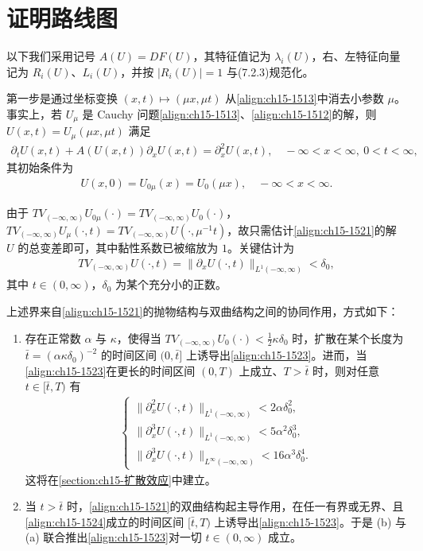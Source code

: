 \documentclass[../../main.tex]{subfiles}
\begin{document}
\section{证明路线图}\label{section:ch15-证明路线图}

以下我们采用记号 $A(U)=DF(U)$，其特征值记为 $\lambda_i(U)$，右、左特征向量记为 $R_i(U)$、$L_i(U)$，并按 $|R_i(U)|=1$ 与(7.2.3)规范化。

第一步是通过坐标变换 $(x,t)\mapsto(\mu x,\mu t)$ 从\eqref{align:ch15-1513}中消去小参数 $\mu$。事实上，若 $U_\mu$ 是 Cauchy 问题\eqref{align:ch15-1513}、\eqref{align:ch15-1512}的解，则 $U(x,t)=U_\mu(\mu x,\mu t)$ 满足
\begin{align}
\partial_t U(x,t)+A(U(x,t))\partial_xU(x,t)=\partial_x^2U(x,t),\quad-\infty<x<\infty,\ 0<t<\infty,
\label{align:ch15-1521}
\end{align}
其初始条件为
\begin{align}
U(x,0)=U_{0\mu}(x)=U_0(\mu x),\quad-\infty<x<\infty.
\label{align:ch15-1522}
\end{align}

由于 $TV_{(-\infty,\infty)}U_{0\mu}(\cdot)=TV_{(-\infty,\infty)}U_0(\cdot)$，$TV_{(-\infty,\infty)}U_\mu(\cdot,t)=TV_{(-\infty,\infty)}U(\cdot,\mu^{-1}t)$，故只需估计\eqref{align:ch15-1521}的解 $U$ 的总变差即可，其中黏性系数已被缩放为 $1$。关键估计为
\begin{align}
TV_{(-\infty,\infty)}U(\cdot,t)=\|\partial_xU(\cdot,t)\|_{L^1(-\infty,\infty)}<\delta_0,
\label{align:ch15-1523}
\end{align}
其中 $t\in(0,\infty)$，$\delta_0$ 为某个充分小的正数。

上述界来自\eqref{align:ch15-1521}的抛物结构与双曲结构之间的协同作用，方式如下：
\begin{enumerate}
\item\label{item:ch15-152-a} 存在正常数 $\alpha$ 与 $\kappa$，使得当 $TV_{(-\infty,\infty)}U_0(\cdot)<\frac12\kappa\delta_0$ 时，扩散在某个长度为 $\bar t=(\alpha\kappa\delta_0)^{-2}$ 的时间区间 $(0,\bar t]$ 上诱导出\eqref{align:ch15-1523}。进而，当\eqref{align:ch15-1523}在更长的时间区间 $(0,T)$ 上成立、$T>\bar t$ 时，则对任意 $t\in[\bar t,T)$ 有
\begin{align}
\begin{cases}
\|\partial_x^2U(\cdot,t)\|_{L^1(-\infty,\infty)}<2\alpha\delta_0^2,\\
\|\partial_x^3U(\cdot,t)\|_{L^1(-\infty,\infty)}<5\alpha^2\delta_0^3,\\
\|\partial_x^3U(\cdot,t)\|_{L^\infty(-\infty,\infty)}<16\alpha^3\delta_0^4.
\end{cases}
\label{align:ch15-1524}
\end{align}
这将在\cref{section:ch15-扩散效应}中建立。
\item\label{item:ch15-152-b} 当 $t>\bar t$ 时，\eqref{align:ch15-1521}的双曲结构起主导作用，在任一有界或无界、且\eqref{align:ch15-1524}成立的时间区间 $[\bar t,T)$ 上诱导出\eqref{align:ch15-1523}。于是 (b) 与 (a) 联合推出\eqref{align:ch15-1523}对一切 $t\in(0,\infty)$ 成立。
\end{enumerate}
\end{document}
